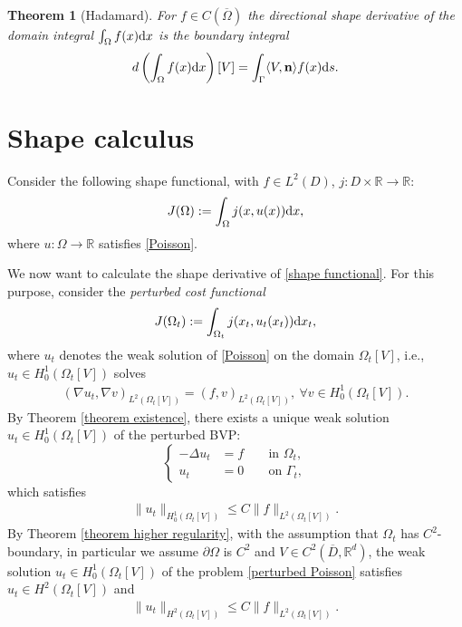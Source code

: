 \documentclass[oneside,11pt]{book}
\numberwithin{equation}{section}
\newtheorem{theorem}{Theorem}[section]
\begin{document}
\begin{theorem}[Hadamard]
    For $f\in C(\overline{\Omega})$ the directional shape derivative of the domain integral $\int_\Omega f(x){\rm d}x$ is the boundary integral
    \begin{align}
        d\left(\int_\Omega f(x){\rm d}x\right)[V] = \int_\Gamma \langle V,{\bf n}\rangle f(x){\rm d}s.
    \end{align}
\end{theorem}

\section{Shape calculus}
Consider the following shape functional, with $f\in L^2(D)$, $j:D\times\mathbb{R}\to\mathbb{R}$:
\begin{align}
    \label{shape functional}
    J(\Omega) := \int_\Omega j(x,u(x)){\rm d}x,
\end{align}
where $u:\Omega\to\mathbb{R}$ satisfies \eqref{Poisson}.

We now want to calculate the shape derivative of \eqref{shape functional}. For this purpose, consider the \textit{perturbed cost functional}
\begin{align}
    \label{perturbed cost functioanl}
    J(\Omega_t) := \int_{\Omega_t} j(x_t,u_t(x_t)){\rm d}x_t,
\end{align}
where $u_t$ denotes the weak solution of \eqref{Poisson} on the domain $\Omega_t[V]$, i.e., $u_t\in H_0^1(\Omega_t[V])$ solves
\begin{align}
    \label{perturbed variational formulation}
    (\nabla u_t,\nabla v)_{L^2(\Omega_t[V])} = (f,v)_{L^2(\Omega_t[V])},\ \forall v\in H_0^1(\Omega_t[V]).
\end{align}
By Theorem \ref{theorem existence}, there exists a unique weak solution $u_t\in H_0^1(\Omega_t[V])$ of the perturbed BVP:
\begin{equation}
    \label{perturbed Poisson}
    \left\{\begin{split}
        -\Delta u_t &= f &&\mbox{ in } \Omega_t,\\
        u_t &= 0 &&\mbox{ on } \Gamma_t,
    \end{split}\right.
\end{equation}
which satisfies
\begin{align}
    \|u_t\|_{H_0^1(\Omega_t[V])}\le C\|f\|_{L^2(\Omega_t[V])}.
\end{align}
By Theorem \ref{theorem higher regularity}, with the assumption that $\Omega_t$ has $C^2$-boundary, in particular we assume $\partial\Omega$ is $C^2$ and $V\in C^2(\overline{D},\mathbb{R}^d)$, the weak solution $u_t\in H_0^1(\Omega_t[V])$ of the problem \eqref{perturbed Poisson} satisfies $u_t\in H^2(\Omega_t[V])$ and
\begin{align}
    \|u_t\|_{H^2(\Omega_t[V])}\le C\|f\|_{L^2(\Omega_t[V])}.
\end{align}
\end{document}
